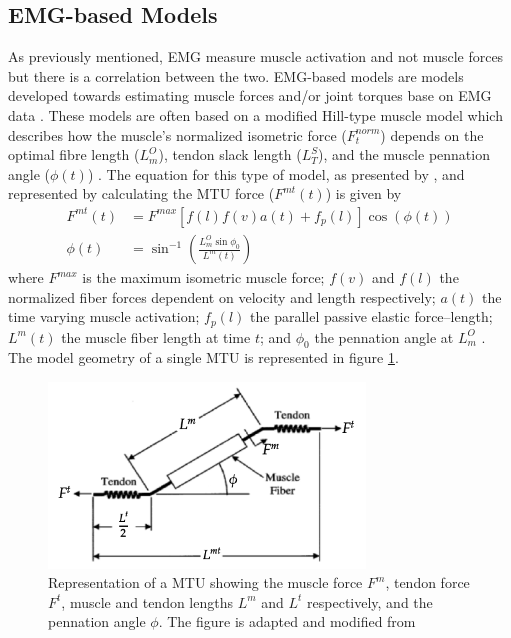 \subsection{\ac{EMG}-based Models}
\label{sec:A-EMGBasedModels}
As previously mentioned, \ac{EMG} measure muscle activation and not muscle forces but there is a correlation between the two.
\ac{EMG}-based models are models developed towards estimating muscle forces and/or joint torques base on \ac{EMG} data \cite{Erdemir2007, Pizzolato2015}.
These models are often based on a modified Hill-type muscle model which describes how the muscle's normalized isometric force  ($F^{norm}_t$) depends on the optimal fibre length ($L^O_m$), tendon slack length ($L^S_T$), and the muscle pennation angle ($\phi (t)$) \cite{Winby2008, Lloyd2003}.
The equation for this type of model, as presented by \textcite{Lloyd2003}, and represented by calculating the \ac{MTU} force ($F^{mt}(t)$) is given by
\begin{align}
\label{eq:hill-equation}
    F^{mt}(t) &= F^{max} \left[ f(l)f(v)a(t) + f_p(l) \right] \cos{\left(\phi (t)\right)} \\ \nonumber
    \phi (t) &= \sin^{-1}\left( \frac{L^O_m\sin{\phi_0}}{L^m(t)}\right)
\end{align}
where $F^{max}$ is the maximum isometric muscle force; $f(v)$ and $f(l)$ the normalized fiber forces dependent on velocity and length respectively; $a(t)$ the time varying muscle activation; $f_p(l)$ the parallel passive elastic force–length; $L^m(t)$ the muscle fiber length at time $t$; and $\phi_0$ the pennation angle at $L^O_m$ \cite{Buchanan2004, Winby2008, Lloyd2003}.
The model geometry of a single \ac{MTU} is represented in figure \ref{fig:MTU-unit}.
\begin{figure}[ht]
    \centering
    \includegraphics[width=0.75\textwidth]{img/MTU-unit}
    \caption{Representation of a \ac{MTU} showing the muscle force $F^m$, tendon force $F^t$, muscle and tendon lengths $L^m$ and $L^t$ respectively, and the pennation angle $\phi$. The figure is adapted and modified from \cite[Fig. 5]{Buchanan2004}}
    \label{fig:MTU-unit}
\end{figure}
